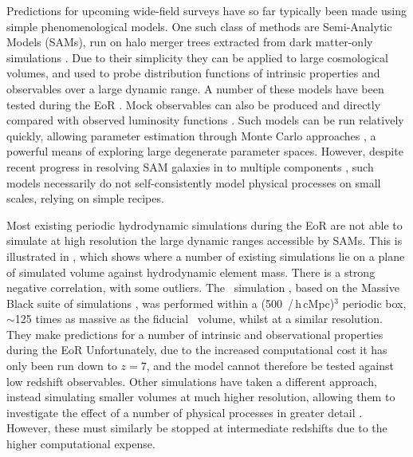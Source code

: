 Predictions for upcoming wide-field surveys have so far typically been made using simple phenomenological models.
One such class of methods are Semi-Analytic Models (SAMs), run on halo merger trees extracted from dark matter-only simulations \citep[for a review, see][]{baugh_primer_2006}.
Due to their simplicity they can be applied to large cosmological volumes, and used to probe distribution functions of intrinsic properties and observables over a large dynamic range.
A number of these models have been tested during the EoR \citep{henriques_galaxy_2015,clay_galaxy_2015,somerville_star_2015, poole_dark-ages_2016, rodrigues_constraints_2017, yung_semi-analytic_2019}.
Mock observables can also be produced and directly compared with observed luminosity functions \citep{lacey_unified_2016,yung_semi-analytic_2019-1,vijayan_detailed_2019}.
Such models can be run relatively quickly, allowing parameter estimation through Monte Carlo approaches \citep{henriques_galaxy_2015}, a powerful means of exploring large degenerate parameter spaces.
However, despite recent progress in resolving SAM galaxies in to multiple components \citep[\textit{e.g.}][]{henriques_l-galaxies_2020}, such models necessarily do not self-consistently model physical processes on small scales, relying on simple recipes.

Most existing periodic hydrodynamic simulations during the EoR are not able to simulate at high resolution the large dynamic ranges accessible by SAMs.
This is illustrated in , which shows where a number of existing simulations lie on a plane of simulated volume against hydrodynamic element mass.
There is a strong negative correlation, with some outliers.
The \bluetides\ simulation \citep{feng_bluetides_2016,feng_formation_2015}, based on the Massive Black suite of simulations \citep{matteo_cold_2012,khandai_massiveblack-ii_2015}, was performed within a (500 \,/\,h\,cMpc)$^3$ periodic box, $\sim$125 times as massive as the fiducial \eagle\ volume, whilst at a similar resolution.
They make predictions for a number of intrinsic and observational properties during the EoR \citep[\textit{e.g.}][]{waters_forecasts_2016, di_matteo_origin_2017, wilkins_photometric_2016, wilkins_lyman-continuum_2016, wilkins_properties_2017, wilkins_dust-obscured_2018, wilkins_nebular_2020}
Unfortunately, due to the increased computational cost it has only been run down to $z = 7$, and the model cannot therefore be tested against low redshift observables.
Other simulations have taken a different approach, instead simulating smaller volumes at much higher resolution, allowing them to investigate the effect of a number of physical processes in greater detail \protect\citep{oshea_probing_2015,jaacks_legacy_2019}.
However, these must similarly be stopped at intermediate redshifts due to the higher computational expense.


